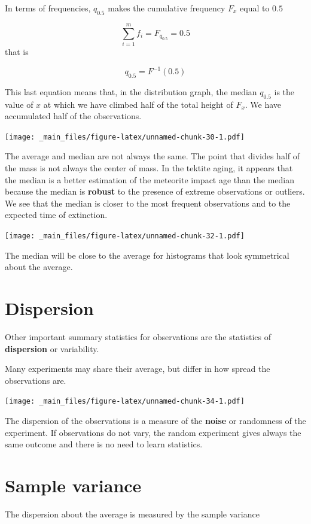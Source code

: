 \documentclass[
]{book}
\begin{document}
In terms of frequencies, \(q_{0.5}\) makes the cumulative frequency \(F_x\) equal to \(0.5\)

\[\sum_{i = 1}^m f_i =F_{q_{0.5}}=0.5\]
that is

\[q_{ 0.5}= F^{-1}(0.5)\]

This last equation means that, in the distribution graph, the median \(q_{ 0.5}\) is the value of \(x\) at which we have climbed half of the total height of \(F_x\). We have accumulated half of the observations.

\texttt{[image: \_main\_files/figure-latex/unnamed-chunk-30-1.pdf]}

The average and median are not always the same. The point that divides half of the mass is not always the center of mass. In the tektite aging, it appears that the median is a better estimation of the meteorite impact age than the median because the median is \textbf{robust} to the presence of extreme observations or outliers. We see that the median is closer to the most frequent observations and to the expected time of extinction.

\texttt{[image: \_main\_files/figure-latex/unnamed-chunk-32-1.pdf]}

The median will be close to the average for histograms that look symmetrical about the average.

\hypertarget{dispersion}{%
\section{Dispersion}\label{dispersion}}

Other important summary statistics for observations are the statistics of \textbf{dispersion} or variability.

Many experiments may share their average, but differ in how spread the observations are.

\texttt{[image: \_main\_files/figure-latex/unnamed-chunk-34-1.pdf]}

The dispersion of the observations is a measure of the \textbf{noise} or randomness of the experiment. If observations do not vary, the random experiment gives always the same outcome and there is no need to learn statistics.

\hypertarget{sample-variance}{%
\section{Sample variance}\label{sample-variance}}

The dispersion about the average is measured by the sample variance
\end{document}
